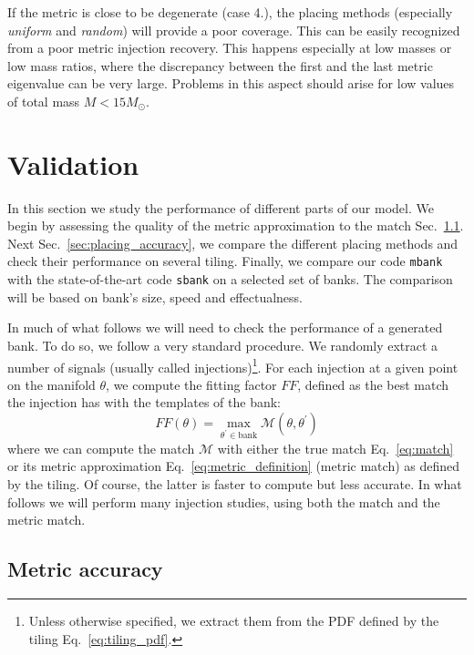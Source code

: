 \documentclass[twocolumn,showpacs,preprintnumbers,nofootinbib,prd,
superscriptaddress,10pt]{revtex4-2}
\begin{document}
If the metric is close to be degenerate (case 4.), the placing methods (especially {\it uniform} and {\it random}) will provide a poor coverage. This can be easily recognized from a poor metric injection recovery. This happens especially at low masses or low mass ratios, where the discrepancy between the first and the last metric eigenvalue can be very large. Problems in this aspect should arise for low values of total mass $M<15 M_{\odot}$.

\section{Validation} \label{sec:validation}

In this section we study the performance of different parts of our model. We begin by assessing the quality of the metric approximation to the match Sec.~\ref{sec:metric_accuracy}.
Next Sec.~\ref{sec:placing_accuracy}, we compare the different placing methods and check their performance on several tiling.
Finally, we compare our code \texttt{mbank} with the state-of-the-art code \texttt{sbank} \cite{sbank} on a selected set of banks. The comparison will be based on bank's size, speed and effectualness.

In much of what follows we will need to check the performance of a generated bank. To do so, we follow a very standard procedure. We randomly extract a number of signals (usually called injections)\footnote{
Unless otherwise specified, we extract them from the PDF defined by the tiling Eq.~\eqref{eq:tiling_pdf}.}.
For each injection at a given point on the manifold $\theta$, we compute the fitting factor $FF$, defined as the best match the injection has with the templates of the bank:
\begin{equation}\label{eq:FF}
	FF(\theta) = \max_{\theta^\prime \in \text{bank}} \mathcal{M}(\theta, \theta^\prime)
\end{equation}
where we can compute the match $\mathcal{M}$ with either the true match Eq.~\eqref{eq:match} or its metric approximation Eq.~\eqref{eq:metric_definition} (metric match) as defined by the tiling.
Of course, the latter is faster to compute but less accurate. In what follows we will perform many injection studies, using both the match and the metric match.


\subsection{Metric accuracy} \label{sec:metric_accuracy}
\end{document}
